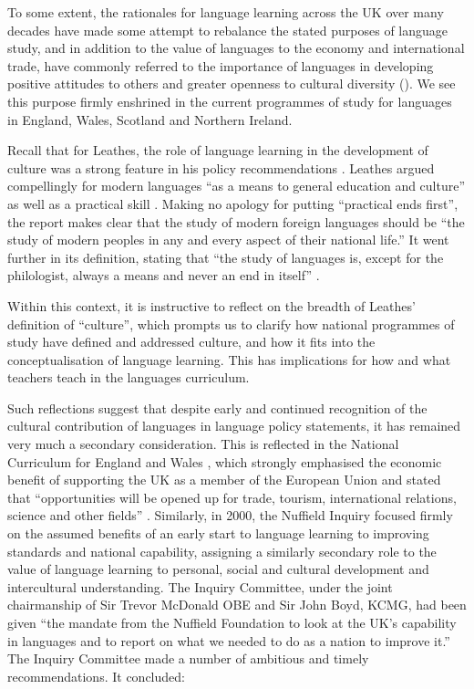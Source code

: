 \documentclass[output=paper]{langscibook}
\begin{document}
To some extent, the rationales for language learning across the UK over many decades have made some attempt to rebalance the stated purposes of language study, and in addition to the value of languages to the economy and international trade, have commonly referred to the importance of languages in developing positive attitudes to others and greater openness to cultural diversity (\citealt{Leathes1918, HMI1987, DES1991, NuffieldFoundation2000, DfES2002, DCSF2005}). We see this purpose firmly enshrined in the current programmes of study for languages in England, Wales, Scotland and Northern Ireland. 

Recall that for Leathes, the role of language learning in the development of culture was a strong feature in his policy recommendations \citep{Leathes1918}. Leathes argued compellingly for modern languages ``as a means to general education and culture'' as well as a practical skill \citep[(v) 53]{Leathes1918}. Making no apology for putting ``practical ends first'', the report makes clear that the study of modern foreign languages should be ``the study of modern peoples in any and every aspect of their national life.'' It went further in its definition, stating that ``the study of languages is, except for the philologist, always a means and never an end in itself'' \citep[1 Definitions (b)]{Leathes1918}. 

Within this context, it is instructive to reflect on the breadth of Leathes’ definition of ``culture'', which prompts us to clarify how national programmes of study have defined and addressed culture, and how it fits into the conceptualisation of language learning. This has implications for how and what teachers teach in the languages curriculum.

Such reflections suggest that despite early and continued recognition of the cultural contribution of languages in language policy statements, it has remained very much a secondary consideration.  This is reflected in the National Curriculum for England and Wales \citep{DfES1988}, which strongly emphasised the economic benefit of supporting the UK as a member of the European Union and stated that ``opportunities will be opened up for trade, tourism, international relations, science and other fields'' \citep[1]{DfES1988}. Similarly, in 2000, the Nuffield Inquiry focused firmly on the assumed benefits of an early start to language learning to improving standards and national capability, assigning a similarly secondary role to the value of language learning to personal, social and cultural development and intercultural understanding. The Inquiry Committee, under the joint chairmanship of Sir Trevor McDonald OBE and Sir John Boyd, KCMG, had been given ``the mandate from the Nuffield Foundation to look at the UK’s capability in languages and to report on what we needed to do as a nation to improve it.'' The Inquiry Committee made a number of ambitious and timely recommendations. It concluded: 
\end{document}
